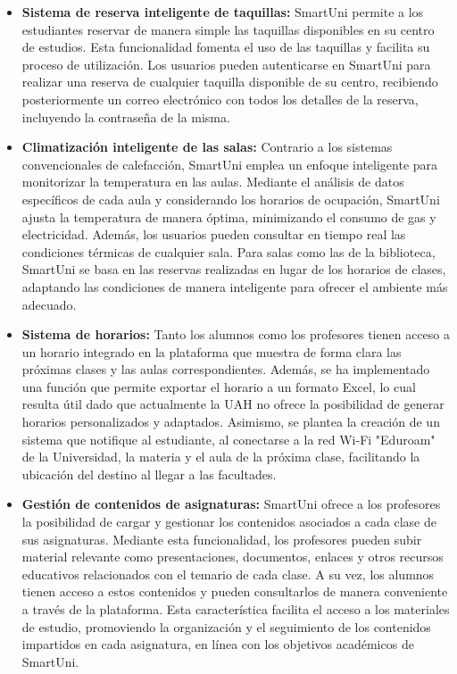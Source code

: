 \documentclass[12pt]{report}
\begin{document}
\begin{itemize}

\item \textbf{Sistema de reserva inteligente de taquillas:} SmartUni permite a los estudiantes reservar de manera simple las taquillas disponibles en su centro de estudios. Esta funcionalidad fomenta el uso de las taquillas y facilita su proceso de utilización. Los usuarios pueden autenticarse en SmartUni para realizar una reserva de cualquier taquilla disponible de su centro, recibiendo posteriormente un correo electrónico con todos los detalles de la reserva, incluyendo la contraseña de la misma.

\item \textbf{Climatización inteligente de las salas:} Contrario a los sistemas convencionales de calefacción, SmartUni emplea un enfoque inteligente para monitorizar la temperatura en las aulas. Mediante el análisis de datos específicos de cada aula y considerando los horarios de ocupación, SmartUni ajusta la temperatura de manera óptima, minimizando el consumo de gas y electricidad. Además, los usuarios pueden consultar en tiempo real las condiciones térmicas de cualquier sala.
Para salas como las de la biblioteca, SmartUni se basa en las reservas realizadas en lugar de los horarios de clases, adaptando las condiciones de manera inteligente para ofrecer el ambiente más adecuado.
\item \textbf{Sistema de horarios:} Tanto los alumnos como los profesores tienen acceso a un horario integrado en la plataforma que muestra de forma clara las próximas clases y las aulas correspondientes. Además, se ha implementado una función que permite exportar el horario a un formato Excel, lo cual resulta útil dado que actualmente la UAH no ofrece la posibilidad de generar horarios personalizados y adaptados. Asimismo, se plantea la creación de un sistema que notifique al estudiante, al conectarse a la red Wi-Fi "Eduroam" de la Universidad, la materia y el aula de la próxima clase, facilitando la ubicación del destino al llegar a las facultades.

\item \textbf{Gestión de contenidos de asignaturas:} SmartUni ofrece a los profesores la posibilidad de cargar y gestionar los contenidos asociados a cada clase de sus asignaturas. Mediante esta funcionalidad, los profesores pueden subir material relevante como presentaciones, documentos, enlaces y otros recursos educativos relacionados con el temario de cada clase. A su vez, los alumnos tienen acceso a estos contenidos y pueden consultarlos de manera conveniente a través de la plataforma. Esta característica facilita el acceso a los materiales de estudio, promoviendo la organización y el seguimiento de los contenidos impartidos en cada asignatura, en línea con los objetivos académicos de SmartUni.


\end{itemize}
\end{document}
